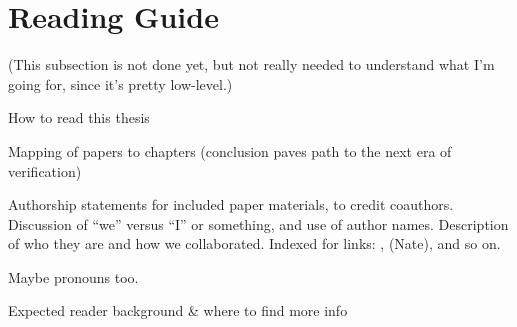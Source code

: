 \section{Reading Guide}


(This subsection is not done yet, but not really needed to understand what I'm going for, since it's pretty low-level.)

How to read this thesis

Mapping of papers to chapters (conclusion paves path to the next era of verification)

Authorship statements for included paper materials, to credit coauthors. Discussion of ``we'' versus ``I'' or something, and use of author names.
Description of who they are and how we collaborated.
Indexed for links: ,  (Nate), and so on.

Maybe pronouns too.

Expected reader background \& where to find more info
